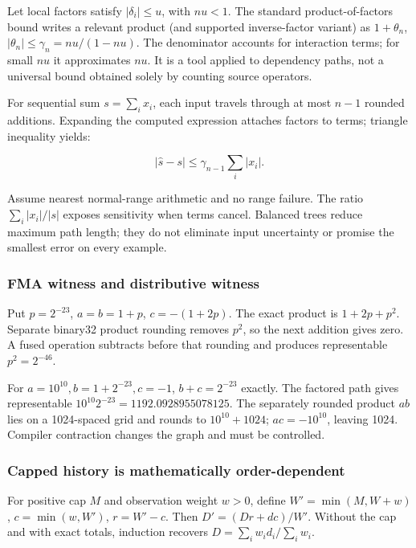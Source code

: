 Let local factors satisfy \(|\delta_i|\le u\), with \(nu<1\). The standard product-of-factors bound writes a relevant product (and supported inverse-factor variant) as \(1+\theta_n\), \(|\theta_n|\le\gamma_n=nu/(1-nu)\). The denominator accounts for interaction terms; for small \(nu\) it approximates \(nu\). It is a tool applied to dependency paths, not a universal bound obtained solely by counting source operators.

For sequential sum \(s=\sum_i x_i\), each input travels through at most \(n-1\) rounded additions. Expanding the computed expression attaches factors to terms; triangle inequality yields:

\[
|\widehat s-s|\le\gamma_{n-1}\sum_i|x_i|.
\]

Assume nearest normal-range arithmetic and no range failure. The ratio \(\sum_i|x_i|/|s|\) exposes sensitivity when terms cancel. Balanced trees reduce maximum path length; they do not eliminate input uncertainty or promise the smallest error on every example.

\subsubsection{FMA witness and distributive witness}\label{fma-witness-and-distributive-witness}

Put \(p=2^{-23}\), \(a=b=1+p\), \(c=-(1+2p)\). The exact product is \(1+2p+p^2\). Separate binary32 product rounding removes \(p^2\), so the next addition gives zero. A fused operation subtracts before that rounding and produces representable \(p^2=2^{-46}\).

For \(a=10^{10},b=1+2^{-23},c=-1\), \(b+c=2^{-23}\) exactly. The factored path gives representable \(10^{10}2^{-23}=1192.0928955078125\). The separately rounded product \(ab\) lies on a 1024-spaced grid and rounds to \(10^{10}+1024\); \(ac=-10^{10}\), leaving 1024. Compiler contraction changes the graph and must be controlled.

\subsubsection{Capped history is mathematically order-dependent}\label{capped-history-is-mathematically-order-dependent}

For positive cap \(M\) and observation weight \(w>0\), define \(W'=\min(M,W+w)\), \(c=\min(w,W')\), \(r=W'-c\). Then \(D'=(Dr+dc)/W'\). Without the cap and with exact totals, induction recovers \(D=\sum_iw_id_i/\sum_iw_i\).


